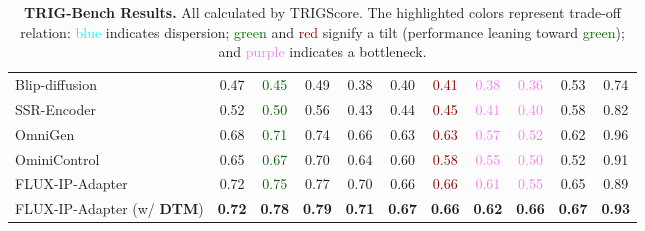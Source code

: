 \begin{table}[htbp]
{\begin{tabular}{lcccccccccc}
\toprule
Blip-diffusion \cite{li2023blip} & 0.47 & \textcolor{darkgreen}{0.45} & 0.49 & 0.38 & 0.40 & \textcolor{darkred}{0.41} & \textcolor{violet}{0.38} & \textcolor{violet}{0.36} & 0.53 & 0.74  \\
SSR-Encoder \cite{zhang2024ssr} & 0.52 & \textcolor{darkgreen}{0.50} & 0.56 & 0.43 & 0.44 & \textcolor{darkred}{0.45} & \textcolor{violet}{0.41} & \textcolor{violet}{0.40} & 0.58 & 0.82  \\
OmniGen \cite{xiao2024omnigen} & 0.68 & \textcolor{darkgreen}{0.71} & 0.74 & 0.66 & 0.63 & \textcolor{darkred}{0.63} & \textcolor{violet}{0.57} & \textcolor{violet}{0.52} & 0.62 & 0.96  \\
OminiControl \cite{tan2024omini} & 0.65 & \textcolor{darkgreen}{0.67} & 0.70 & 0.64 & 0.60 & \textcolor{darkred}{0.58} & \textcolor{violet}{0.55} & \textcolor{violet}{0.50} & 0.52 & 0.91  \\
FLUX-IP-Adapter \cite{flux_ip_adapter_v2} & 0.72 & \textcolor{darkgreen}{0.75} & 0.77 & 0.70 & 0.66 & \textcolor{darkred}{0.66} & \textcolor{violet}{0.61} & \textcolor{violet}{0.55} & 0.65 & 0.89 \\
\rowcolor{trig}
FLUX-IP-Adapter  (w/ \textbf{DTM}) & \textbf{0.72} & \textbf{0.78} & \textbf{0.79} & \textbf{0.71} & \textbf{0.67} & \textbf{0.66} & \textbf{0.62} & \textbf{0.66} & \textbf{0.67} & \textbf{0.93}  \\
\bottomrule
\end{tabular}
}
\caption{\textbf{TRIG-Bench Results.} All calculated by TRIGScore. The highlighted colors represent trade-off relation: \textcolor{cyan}{blue} indicates dispersion; \textcolor{darkgreen}{green} and \textcolor{darkred}{red} signify a tilt (performance leaning toward \textcolor{darkgreen}{green}); and \textcolor{violet}{purple} indicates a bottleneck.}
\label{tab:mog}
\end{table}
